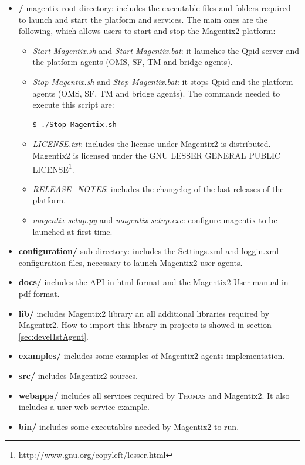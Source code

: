 \begin{itemize}
\item \textbf{/} magentix root directory: 
 includes the executable files and folders required to launch and start the platform and services. The main ones are the following, which allows users to start and stop the Magentix2 platform:

    \begin{itemize}
         \item \textit{Start-Magentix.sh} and \textit{Start-Magentix.bat}: it launches the Qpid server and the platform agents (OMS, SF, TM and bridge agents).  %

        \item \textit{Stop-Magentix.sh} and \textit{Stop-Magentix.bat}: it stops Qpid and the platform agents (OMS, SF, TM and bridge agents). The commands needed to execute this script are:
        \begin{verbatim}
$ ./Stop-Magentix.sh
        \end{verbatim}

        \item \textit{LICENSE.txt}: includes the license under Magentix2 is distributed. Magentix2 is licensed under the GNU LESSER GENERAL PUBLIC LICENSE\footnote{\url{http://www.gnu.org/copyleft/lesser.html}}.
        \item \textit{RELEASE\_NOTES}: includes the changelog of the last releases of the platform.
        \item \textit{magentix-setup.py} and \textit{magentix-setup.exe}: configure magentix to be launched at first time.
    \end{itemize}

\item \textbf{configuration/} sub-directory: includes the Settings.xml and loggin.xml configuration files, necessary to launch Magentix2 user agents.

 
\item \textbf{docs/}
 includes the API in html format and the Magentix2 User manual in pdf format.
\item \textbf{lib/}
 includes Magentix2 library an all additional libraries required by Magentix2. How to import this library in projects is showed in  section \ref{sec:devel1stAgent}.
\item \textbf{examples/}
 includes some examples of Magentix2 agents implementation.
\item \textbf{src/}
 includes Magentix2 sources.
\item \textbf{webapps/}
 includes all services required by \textsc{Thomas} and Magentix2. It also includes a user web service example. 
 \item \textbf{bin/}
  includes some executables needed by Magentix2 to run.
\end{itemize}


